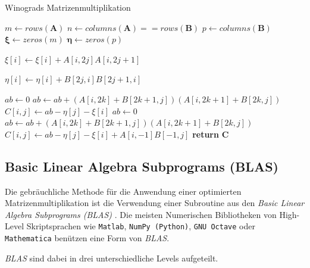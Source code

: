\begin{algorithm}\footnotesize\caption{Winograds Matrizenmultiplikation}
	\setlength{\lineskip}{7pt}
	\label{multiplikation:alg:winograd}
	\begin{algorithmic}
		\State  $ m \gets rows(\mathbf{A})$
		\State  $ n \gets columns(\mathbf{A}) == rows(\mathbf{B})$
		\State  $ p \gets columns(\mathbf{B})$
		\State  $ \mathbf{\xi} \gets zeros(m)$
		\State  $ \mathbf{\eta} \gets zeros(p)$


		\State $\xi[i] \gets \xi[i]+A[i,2 j]A[i,2 j+1]$
		\EndFor
		\EndFor

		\State $\eta[i] \gets   \eta[i]+B[2 j,i]B[2 j+1,i]$
		\EndFor
		\EndFor

		\State $ab \gets 0$
		\State $ab \gets ab + (A[i,2k]+B[2k+1,j])(A[i,2k+1]+B[2k,j])$
		\EndFor
		\State $C[i,j] \gets ab-\eta[j]-\xi[i]$
		\EndFor
		\EndFor
    \Else
		\State $ab \gets 0$
		\State $ab \gets ab + (A[i,2k]+B[2k+1,j])(A[i,2k+1]+B[2k,j])$
		\EndFor
		\State $C[i,j] \gets ab-\eta[j]-\xi[i]+A[i,-1]B[-1,j]$
		\EndFor
		\EndFor
		\EndIf
		\State \textbf{return} $\textbf{C}$

		\EndFunction
	\end{algorithmic}
\end{algorithm}


\subsection{Basic Linear Algebra Subprograms (BLAS)}

Die gebräuchliche Methode f\"ur die Anwendung einer optimierten Matrizenmultiplikation ist die Verwendung einer Subroutine aus den \textit{Basic Linear Algebra Subprograms (BLAS)}  \cite{multiplikation:BLAS}.
Die meisten Numerischen Bibliotheken von High-Level Skriptsprachen wie \texttt{Matlab}, \texttt{NumPy (Python)}, \texttt{GNU Octave} oder \texttt{Mathematica} ben\"utzen eine Form von \textit{BLAS}.

\textit{BLAS} sind dabei in drei unterschiedliche Levels aufgeteilt.

